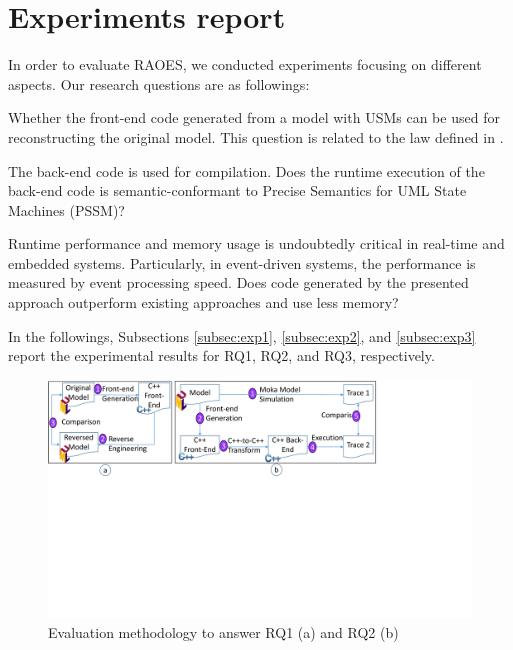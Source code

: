 \section{Experiments report}
\label{sec:exp}

In order to evaluate RAOES, we conducted experiments focusing on different aspects. 
Our research questions are as followings:
\begin{description}[\footnotesize]
	\item[\tb{RQ1}] %
	Whether the front-end code generated from a model with USMs can be used for reconstructing the original model. This question is related to the  law defined in \cite{foster_combinators_2007}.
	
	\item[\tb{RQ2}] The back-end code is used for compilation. 
	Does the runtime execution of the back-end code is semantic-conformant to Precise Semantics for UML State Machines (PSSM)? 
	
	\item[\tb{RQ3}] Runtime performance and memory usage is undoubtedly critical in real-time and embedded systems. Particularly, in event-driven systems, the performance is measured by event processing speed. Does code generated by the presented approach outperform existing approaches and use less memory?
\end{description} 


In the followings, Subsections \ref{subsec:exp1}, \ref{subsec:exp2}, and \ref{subsec:exp3} report the experimental results for RQ1, RQ2, and RQ3, respectively.

\begin{figure}
	\centering
	\includegraphics[clip, trim=0cm 11.4cm 7.65cm 0cm, width=\columnwidth]{figures/rq1-2evaluation}
	\caption{Evaluation methodology to answer RQ1 (a) and RQ2 (b)} 
	\label{fig:rq1-2evaluation}
\end{figure}

